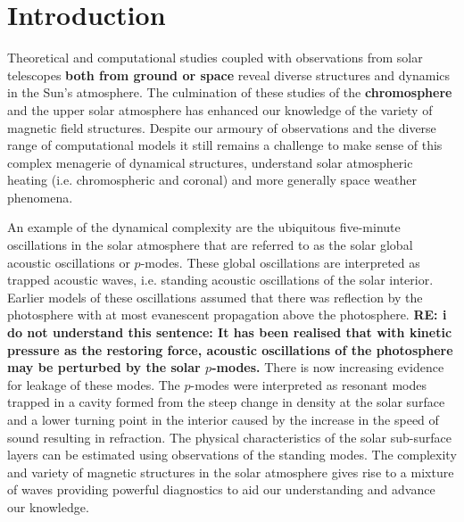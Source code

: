 \documentclass[physics,article,submit,pdftex,moreauthors]{Definitions/mdpi}
\begin{document}
\setcounter{section} %

\section{Introduction}

Theoretical and computational studies coupled with observations from solar telescopes {\bf both from ground or space} reveal diverse structures and dynamics in the Sun's atmosphere. The culmination of these studies of the {\bf chromosphere} and the upper solar atmosphere has enhanced our knowledge of the variety of magnetic field structures.  Despite our armoury of observations and the diverse range of computational models it still remains a challenge to make sense of this complex menagerie of dynamical structures, understand solar atmospheric heating (i.e. chromospheric and coronal) and more generally space weather phenomena.


An example of the dynamical complexity are the ubiquitous five-minute oscillations in the solar atmosphere that are referred to as the solar global acoustic oscillations or $p$-modes. These global oscillations are interpreted as trapped acoustic waves, i.e. standing acoustic oscillations of the solar interior. Earlier models of these oscillations assumed that there was reflection by the photosphere with at most evanescent propagation above the photosphere. {\bf RE: i do not understand this sentence: It has been realised that with kinetic pressure as the restoring force, acoustic oscillations of the photosphere may be perturbed by the solar $p$-modes.} There is now increasing evidence for leakage of these modes. The $p$-modes were interpreted as resonant modes trapped in a cavity formed from the steep change in density at the solar surface and a lower turning point in the interior caused by the increase in the speed of sound resulting in refraction. The physical characteristics of the solar sub-surface layers can be estimated using observations of the standing modes. The complexity and variety of magnetic structures in the solar atmosphere gives rise to a mixture of waves providing powerful diagnostics to aid our understanding and advance our knowledge.
\end{document}
